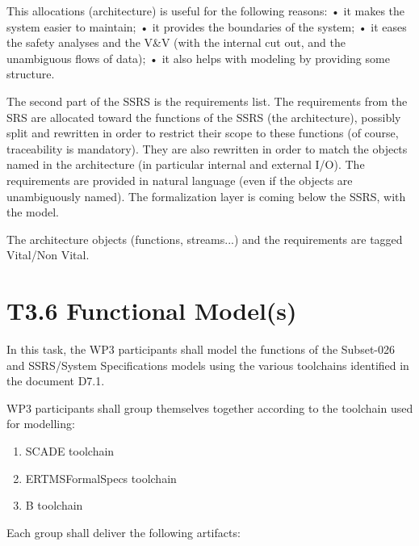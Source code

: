 \documentclass{template/openetcs_article}
\begin{document}
This allocations (architecture) is useful for the following reasons:
•	it makes the system easier to maintain;
•	it provides the boundaries of the system;
•	it eases the safety analyses and the V&V (with the internal cut out, and the unambiguous flows of data);
•	it also helps  with modeling by providing some structure.

The second part of the SSRS is the requirements list. The requirements from the SRS are allocated toward the functions of the SSRS (the architecture), possibly split and rewritten in order to restrict their scope to these functions (of course, traceability is mandatory). They are also rewritten in order to match the objects named in the architecture (in particular internal and external I/O). The requirements are provided in natural language (even if the objects are unambiguously named). The formalization layer is coming below the SSRS, with the model.
 
The architecture objects (functions, streams...) and the requirements are tagged Vital/Non Vital.

\section{T3.6 Functional Model(s)}

In this task, the WP3 participants shall model the functions of the Subset-026 and SSRS/System Specifications models using the various toolchains 
identified in the document D7.1.


WP3 participants shall group themselves together according to the toolchain used for modelling:

\begin{enumerate}
	\item SCADE toolchain
	\item ERTMSFormalSpecs toolchain
	\item B toolchain
\end{enumerate}

Each group shall deliver the following artifacts:
\end{document}
